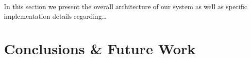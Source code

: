 In this section we present the overall architecture of our system as well as specific implementation details regarding…





\cleardoublepage
\chapter{Conclusions \& Future Work}





\appendix
\cleardoublepage
% 

\cleardoublepage
\cleardoublepage


